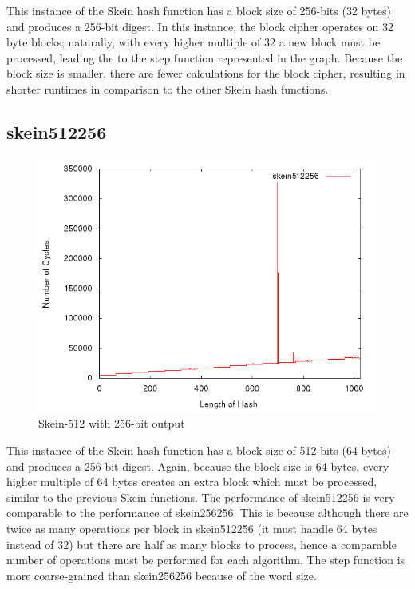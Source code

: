 \documentclass[10pt,a4paper]{article}
\begin{document}
This instance of the Skein hash function has a block size of 256-bits (32 bytes) and produces a 256-bit digest.  In this instance, the block cipher operates on 32 byte blocks; naturally, with every higher multiple of 32 a new block must be processed, leading the to the step function represented in the graph.  Because the block size is smaller, there are fewer calculations for the block cipher, resulting in shorter runtimes in comparison to the other Skein hash functions.

\subsection{skein512256}

    \begin{figure}[H]
        \begin{center}
            \includegraphics[scale=0.5]{images/skein512256.png} 
            \caption{Skein-512 with 256-bit output}
        \end{center}
    \end{figure}

This instance of the Skein hash function has a block size of 512-bits (64 bytes) and produces a 256-bit digest.  Again, because the block size is 64 bytes, every higher multiple of 64 bytes creates an extra block which must be processed, similar to the previous Skein functions.  The performance of skein512256 is very comparable to the performance of skein256256.  This is because although there are twice as many operations per block in skein512256 (it must handle 64 bytes instead of 32) but there are half as many blocks to process, hence a comparable number of operations must be performed for each algorithm.  The step function is more coarse-grained than skein256256 because of the word size.
\end{document}
